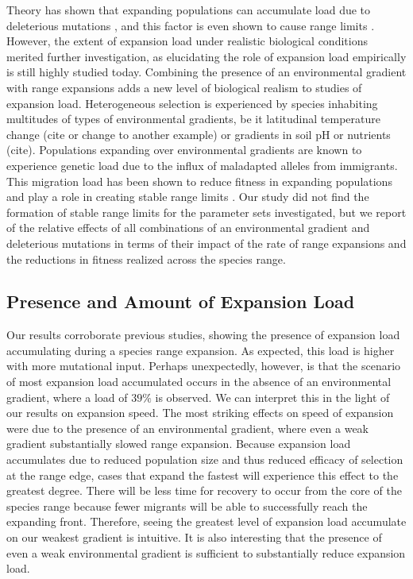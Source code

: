 Theory has shown that expanding populations can accumulate load due to deleterious mutations \citep{Peischl:2013, Peischl:2015, Peischl:2015b}, and this factor is even shown to cause range limits \citep{Peischl:2015b}. %
However, the extent of expansion load under realistic biological conditions merited further investigation, as elucidating the role of expansion load empirically is still highly studied today. Combining the presence of an environmental gradient with range expansions adds a new level of biological realism to studies of expansion load. Heterogeneous selection is experienced by species inhabiting multitudes of types of environmental gradients, be it latitudinal temperature change \color{red}(cite or change to another example) \color{black} or gradients in soil pH or nutrients \color{red}(cite)\color{black}. Populations expanding over environmental gradients are known to experience genetic load due to the influx of maladapted alleles from immigrants. This migration load has been shown to reduce fitness in expanding populations and play a role in creating stable range limits \citep{Bridle:2010, Polechova:2015}. %
Our study did not find the formation of stable range limits for the parameter sets investigated, but we report of the relative effects of all combinations of an environmental gradient and deleterious mutations in terms of their impact of the rate of range expansions and the reductions in fitness realized across the species range.


\subsection*{Presence and Amount of Expansion Load}

Our results corroborate previous studies, showing the presence of expansion load accumulating during a species range expansion. As expected, this load is higher with more mutational input. Perhaps unexpectedly, however, is that the scenario of most expansion load accumulated occurs in the absence of an environmental gradient, where a load of $39\%$ is observed. We can interpret this in the light of our results on expansion speed. The most striking effects on speed of expansion were due to the presence of an environmental gradient, where even a weak gradient substantially slowed range expansion. Because expansion load accumulates due to reduced population size and thus reduced efficacy of selection at the range edge, cases that expand the fastest will experience this effect to the greatest degree. There will be less time for recovery to occur from the core of the species range because fewer migrants will be able to successfully reach the expanding front. Therefore, seeing the greatest level of expansion load accumulate on our weakest gradient is intuitive. It is also interesting that the presence of even a weak environmental gradient is sufficient to substantially reduce expansion load.

